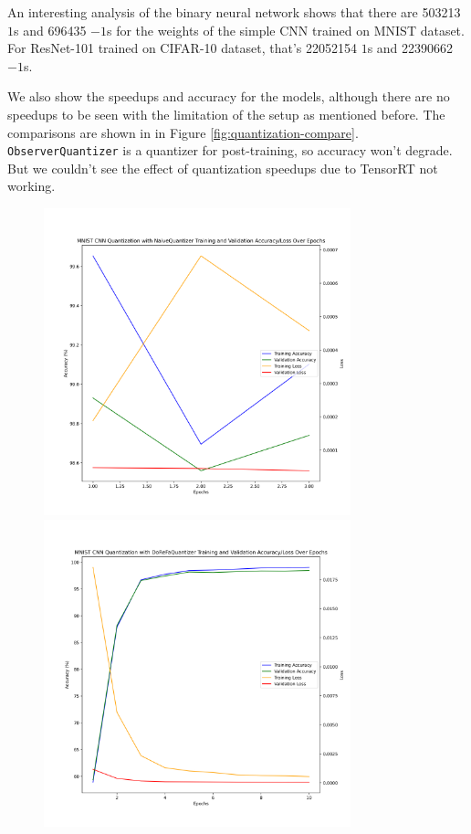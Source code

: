 \documentclass{article}
\begin{document}
An interesting analysis of the binary neural network shows that there are 503213 $1$s and 696435 $-1$s for the weights of the simple CNN trained on MNIST dataset. For ResNet-101 trained on CIFAR-10 dataset, that's 22052154 $1$s and 22390662 $-1$s.

We also show the speedups and accuracy for the models, although there are no speedups to be seen with the limitation of the setup as mentioned before. The comparisons are shown in in Figure \ref{fig:quantization-compare}. \verb|ObserverQuantizer| is a quantizer for post-training, so accuracy won't degrade. But we couldn't see the effect of quantization speedups due to TensorRT not working.

\begin{figure}
    \centerline{\includegraphics[width=3.5in]{../proj2/figures/mnist_cnn_NaiveQuantizer.png}\includegraphics[width=3.5in]{../proj2/figures/mnist_cnn_DoReFaQuantizer.png}}

\end{figure}
\end{document}
